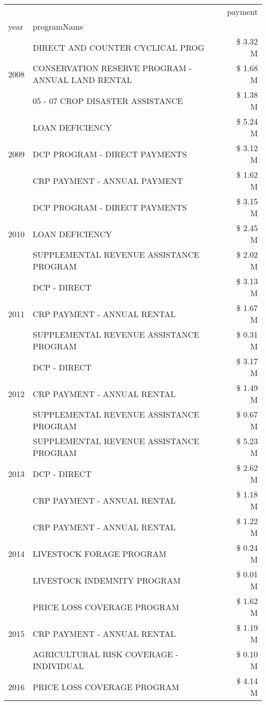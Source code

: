 \begin{tabular}{llr}
\toprule
 &  & payment \\
year & programName &  \\
\midrule
\multirow[t]{3}{*}{2008} & DIRECT AND COUNTER CYCLICAL PROG & \$ 3.32 M \\
 & CONSERVATION RESERVE PROGRAM - ANNUAL LAND RENTAL & \$ 1.68 M \\
 & 05 - 07 CROP DISASTER ASSISTANCE & \$ 1.38 M \\
\cline{1-3}
\multirow[t]{3}{*}{2009} & LOAN DEFICIENCY & \$ 5.24 M \\
 & DCP PROGRAM - DIRECT PAYMENTS & \$ 3.12 M \\
 & CRP PAYMENT - ANNUAL PAYMENT & \$ 1.62 M \\
\cline{1-3}
\multirow[t]{3}{*}{2010} & DCP PROGRAM - DIRECT PAYMENTS & \$ 3.15 M \\
 & LOAN DEFICIENCY & \$ 2.45 M \\
 & SUPPLEMENTAL REVENUE ASSISTANCE PROGRAM & \$ 2.02 M \\
\cline{1-3}
\multirow[t]{3}{*}{2011} & DCP - DIRECT & \$ 3.13 M \\
 & CRP PAYMENT - ANNUAL RENTAL & \$ 1.67 M \\
 & SUPPLEMENTAL REVENUE ASSISTANCE PROGRAM & \$ 0.31 M \\
\cline{1-3}
\multirow[t]{3}{*}{2012} & DCP - DIRECT & \$ 3.17 M \\
 & CRP PAYMENT - ANNUAL RENTAL & \$ 1.49 M \\
 & SUPPLEMENTAL REVENUE ASSISTANCE PROGRAM & \$ 0.67 M \\
\cline{1-3}
\multirow[t]{3}{*}{2013} & SUPPLEMENTAL REVENUE ASSISTANCE PROGRAM & \$ 5.23 M \\
 & DCP - DIRECT & \$ 2.62 M \\
 & CRP PAYMENT - ANNUAL RENTAL & \$ 1.18 M \\
\cline{1-3}
\multirow[t]{3}{*}{2014} & CRP PAYMENT - ANNUAL RENTAL & \$ 1.22 M \\
 & LIVESTOCK FORAGE PROGRAM & \$ 0.24 M \\
 & LIVESTOCK INDEMNITY PROGRAM & \$ 0.01 M \\
\cline{1-3}
\multirow[t]{3}{*}{2015} & PRICE LOSS COVERAGE PROGRAM & \$ 1.62 M \\
 & CRP PAYMENT - ANNUAL RENTAL & \$ 1.19 M \\
 & AGRICULTURAL RISK COVERAGE - INDIVIDUAL & \$ 0.10 M \\
\cline{1-3}
\multirow[t]{3}{*}{2016} & PRICE LOSS COVERAGE PROGRAM & \$ 4.14 M \\

\end{tabular}
